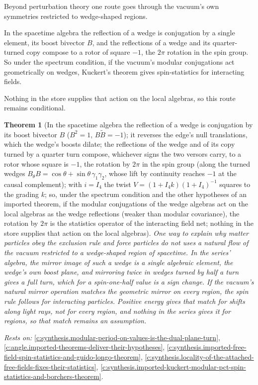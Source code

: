 \documentclass[11pt]{article}
\newtheorem{theorem}{Theorem}[section]
\theoremstyle{definition}
\theoremstyle{plain}
\begin{document}
Beyond perturbation theory one route goes through the vacuum's own symmetries restricted to wedge-shaped regions.

In the spacetime algebra the reflection of a wedge is conjugation by a single element, its boost bivector $B$, and the reflections of a wedge and its quarter-turned copy compose to a rotor of square $-1$, the $2\pi$ rotation in the spin group. So under the spectrum condition, if the vacuum's modular conjugations act geometrically on wedges, Kuckert's theorem gives spin-statistics for interacting fields.

Nothing in the store supplies that action on the local algebras, so this route remains conditional.

\begin{theorem}[In the spacetime algebra the reflection of a wedge is conjugation by its boost bivector $B$ ($B^{2} = 1$, $B\tilde B = -1$); it reverses the edge's null translations, which the wedge's boosts dilate; the reflections of the wedge and of its copy turned by a quarter turn compose, whichever signs the two versors carry, to a rotor whose square is $-1$, the rotation by $2\pi$ in the spin group (along the turned wedges $B_{\theta}B = \cos\theta + \sin\theta\,\gamma_{1}\gamma_{2}$, whose lift by continuity reaches $-1$ at the causal complement); with $i = I_{4}$ the twist $V = (1 + I_{4}k)(1 + I_{4})^{-1}$ squares to the grading $k$; so, under the spectrum condition and the other hypotheses of an imported theorem, if the modular conjugations of the wedge algebras act on the local algebras as the wedge reflections (weaker than modular covariance), the rotation by $2\pi$ is the statistics operator of the interacting field net; nothing in the store supplies that action on the local algebras]\label{c:synthesis.wedge-reflections-compose-to-the-two-pi-rotor-so-geometric-modular-conjugations-give-interacting-spin-statistics}
One way to explain why matter particles obey the exclusion rule and force particles do not uses a natural flow of the vacuum restricted to a wedge-shaped region of spacetime. In the series' algebra, the mirror image of such a wedge is a single algebraic element, the wedge's own boost plane, and mirroring twice in wedges turned by half a turn gives a full turn, which for a spin-one-half value is a sign change. If the vacuum's natural mirror operation matches the geometric mirror on every region, the spin rule follows for interacting particles. Positive energy gives that match for shifts along light rays, not for every region, and nothing in the series gives it for regions, so that match remains an assumption.
\end{theorem}
\noindent\emph{Rests on:} \ref{c:synthesis.modular-period-on-values-is-the-dual-plane-turn}, \ref{c:angle.imported-theorems-deliver-their-hypotheses}, \ref{c:synthesis.imported-free-field-spin-statistics-and-guido-longo-theorem}, \ref{c:synthesis.locality-of-the-attached-free-fields-fixes-their-statistics}, \ref{c:synthesis.imported-kuckert-modular-pct-spin-statistics-and-borchers-theorem}.
\end{document}
